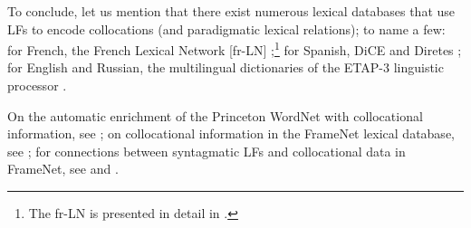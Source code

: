 To conclude, let us mention that there exist numerous lexical databases that use LFs to encode collocations (and paradigmatic lexical relations); to name a few: for French, the French Lexical Network [fr-LN] \parencite{LuxPogodallaPolguere2011};\footnote{The fr-LN is presented in detail in .} for Spanish, DiCE \parencite{AlonsoRamosEtAl2010} and Diretes \parencite{BarriosRodriguezBoguslavsky2019}; for English and Russian, the multilingual dictionaries of the ETAP-3 linguistic processor \parencite{BoguslavskyEtAl2004}.

\label{txt:collInfoInWordNet}\begin{furtherreading}
On the automatic enrichment of the Princeton WordNet with collocational information, see \textcite{Espinosa-AnkeEtAl2016}; on collocational information in the FrameNet lexical database, see \textcite{RuppenhoferEtAl2002b}; for connections between syntagmatic LFs and collocational data in FrameNet, see \textcite[3--5]{Langer2005} and \textcite{BouveretFillmore2008}.
\end{furtherreading}

\clearpage{\pagestyle{empty}\cleardoublepage}

